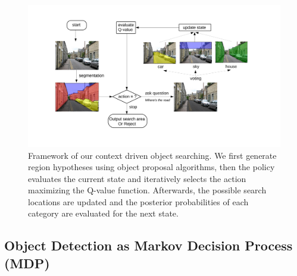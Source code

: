 
\begin{figure}[htb]
\begin{center}
\includegraphics[width=\linewidth]{figures/flowchart_Q.pdf}
\caption{Framework of our context driven object searching. We first generate region hypotheses using object proposal algorithms, then the policy evaluates the current state and iteratively selects the action maximizing the Q-value function. Afterwards, the possible search locations are updated and the posterior probabilities of each category are evaluated for the next state.}
\label{fig:flowchart}
\end{center}

\end{figure}

\subsection{Object Detection as Markov Decision Process (MDP)}
\label{sec:policy}

